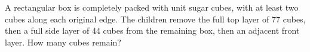 A rectangular box is completely packed with unit sugar cubes, with at least two cubes along each original edge. The children remove the full top layer of 77 cubes, then a full side layer of 44 cubes from the remaining box, then an adjacent front layer. How many cubes remain?

